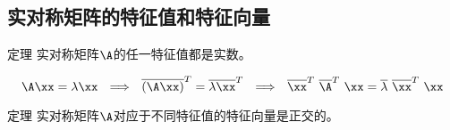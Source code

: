 \subsection{实对称矩阵的特征值和特征向量}

\begin{frame}
  \begin{footnotesize}
    \begin{block}{定理}
      实对称矩阵$\A$的任一特征值都是实数。
    \end{block}
    \pause\proofname
    $$
    \A\xx = \lambda \xx
    ~~\Longrightarrow~~
    \overline{(\A\xx)}^T = \overline{\lambda \xx}^T
    ~~\Longrightarrow~~
    \overline{\xx}^T~\overline{\A}^T~\xx = \overline{\lambda} ~\overline{\xx}^T~\xx
    $$
  \end{footnotesize}
\end{frame}


\begin{frame}
  \begin{footnotesize}
    \begin{block}{定理}
      实对称矩阵$\A$对应于不同特征值的特征向量是正交的。
    \end{block}
  \end{footnotesize}
\end{frame}
